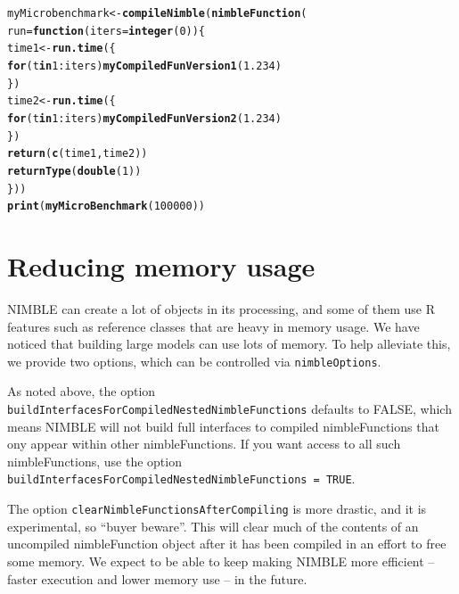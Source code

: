 \documentclass[12pt,oneside]{book}\usepackage[]{graphicx}\usepackage[]{color}
\makeatletter
\newcommand{\hlnum}[1]{\textcolor[rgb]{0.686,0.059,0.569}{#1}}%
\newcommand{\hlopt}[1]{\textcolor[rgb]{0,0,0}{#1}}%
\newcommand{\hlstd}[1]{\textcolor[rgb]{0.345,0.345,0.345}{#1}}%
\newcommand{\hlkwa}[1]{\textcolor[rgb]{0.161,0.373,0.58}{\textbf{#1}}}%
\newcommand{\hlkwb}[1]{\textcolor[rgb]{0.69,0.353,0.396}{#1}}%
\newcommand{\hlkwc}[1]{\textcolor[rgb]{0.333,0.667,0.333}{#1}}%
\newcommand{\hlkwd}[1]{\textcolor[rgb]{0.737,0.353,0.396}{\textbf{#1}}}%
\newenvironment{kframe}{%
 \def\at@end@of@kframe{}%
 \ifinner\ifhmode%
  \def\at@end@of@kframe{\end{minipage}}%
  \begin{minipage}{\columnwidth}%
 \fi\fi%
 \def\FrameCommand##1{\hskip\@totalleftmargin \hskip-\fboxsep
 \colorbox{shadecolor}{##1}\hskip-\fboxsep
     \hskip-\linewidth \hskip-\@totalleftmargin \hskip\columnwidth}%
 \MakeFramed {\advance\hsize-\width
   \@totalleftmargin\z@ \linewidth\hsize
   \@setminipage}}%
 {\par\unskip\endMakeFramed%
 \at@end@of@kframe}
\newenvironment{knitrout}{}{} %
\def\cd#1{\texttt{#1}}
\makeatother
\begin{document}
{\begin{knitrout}
\color{fgcolor}\begin{kframe}
\begin{alltt}
\hlstd{myMicrobenchmark} \hlkwb{<-} \hlkwd{compileNimble}\hlstd{(}\hlkwd{nimbleFunction}\hlstd{(}
    \hlkwc{run} \hlstd{=} \hlkwa{function}\hlstd{(}\hlkwc{iters} \hlstd{=} \hlkwd{integer}\hlstd{(}\hlnum{0}\hlstd{))\{}
        \hlstd{time1} \hlkwb{<-} \hlkwd{run.time}\hlstd{(\{}
            \hlkwa{for} \hlstd{(t} \hlkwa{in} \hlnum{1}\hlopt{:}\hlstd{iters)} \hlkwd{myCompiledFunVersion1}\hlstd{(}\hlnum{1.234}\hlstd{)}
        \hlstd{\})}
        \hlstd{time2} \hlkwb{<-} \hlkwd{run.time}\hlstd{(\{}
            \hlkwa{for} \hlstd{(t} \hlkwa{in} \hlnum{1}\hlopt{:}\hlstd{iters)} \hlkwd{myCompiledFunVersion2}\hlstd{(}\hlnum{1.234}\hlstd{)}
        \hlstd{\})}
        \hlkwd{return}\hlstd{(}\hlkwd{c}\hlstd{(time1, time2))}
        \hlkwd{returnType}\hlstd{(}\hlkwd{double}\hlstd{(}\hlnum{1}\hlstd{))}
    \hlstd{\}))}
\hlkwd{print}\hlstd{(}\hlkwd{myMicroBenchmark}\hlstd{(}\hlnum{100000}\hlstd{))}
\end{alltt}
\end{kframe}
\end{knitrout}

\section{Reducing memory usage}

NIMBLE can create a lot of objects in its processing, and some of them
use R features such as reference classes that are heavy in memory
usage.  We have noticed that building large models can use lots of
memory.  To help alleviate this, we provide two options, which can be
controlled via \cd{nimbleOptions}.

As noted above, the option \cd{buildInterfacesForCompiledNestedNimbleFunctions} 
defaults to FALSE, which means NIMBLE will not build full interfaces to compiled
nimbleFunctions that ony appear within other nimbleFunctions.  If you
want access to all such nimbleFunctions, use the option 
\cd{buildInterfacesForCompiledNestedNimbleFunctions = TRUE}.

The option \cd{clearNimbleFunctionsAfterCompiling} is more drastic, and it is
experimental, so ``buyer beware''.  This will clear much of the
contents of an uncompiled nimbleFunction object after it has been
compiled in an effort to free some memory.  We expect to be able to
keep making NIMBLE more efficient -- faster execution and lower memory
use -- in the future.






\end{document}
